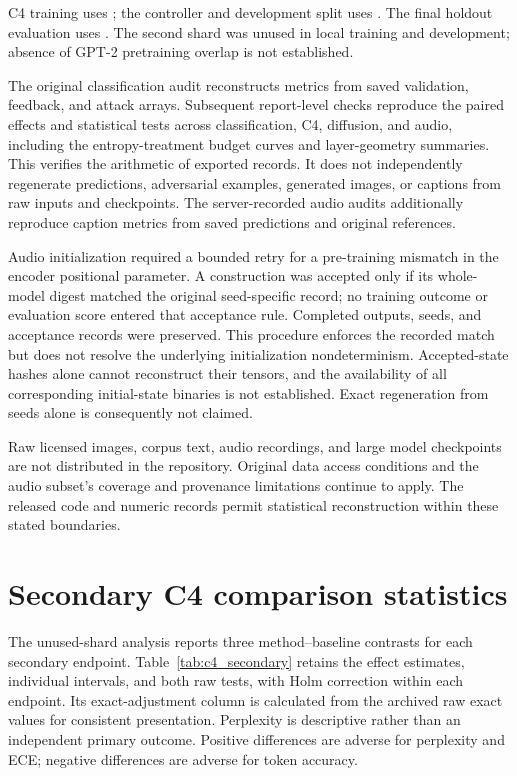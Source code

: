 \documentclass[a4paper,fleqn]{cas-dc}
\begin{document}
C4 training uses ; the controller
and development split uses .
The final holdout evaluation uses
.
The second shard was unused in local training and development; absence
of GPT-2 pretraining overlap is not established.

The original classification audit reconstructs metrics from saved
validation, feedback, and attack arrays. Subsequent report-level checks
reproduce the paired effects and statistical tests across classification,
C4, diffusion, and audio, including the entropy-treatment budget curves
and layer-geometry summaries. This verifies the arithmetic of exported
records. It does not independently regenerate predictions, adversarial
examples, generated images, or captions from raw inputs and checkpoints.
The server-recorded audio audits additionally reproduce caption metrics
from saved predictions and original references.

Audio initialization required a bounded retry for a pre-training
mismatch in the encoder positional parameter. A construction was accepted
only if its whole-model digest matched the original seed-specific record;
no training outcome or evaluation score entered that acceptance rule.
Completed outputs, seeds, and acceptance records were preserved. This
procedure enforces the recorded match but does not resolve the underlying
initialization nondeterminism. Accepted-state hashes alone cannot
reconstruct their tensors, and the availability of all corresponding
initial-state binaries is not established. Exact regeneration from seeds
alone is consequently not claimed.

Raw licensed images, corpus text, audio recordings, and large model
checkpoints are not distributed in the repository. Original data access
conditions and the audio subset's coverage and provenance limitations
continue to apply. The released code and numeric records permit statistical
reconstruction within these stated boundaries.

\section{Secondary C4 comparison statistics}\label{app:c4_secondary}
The unused-shard analysis reports three method--baseline
contrasts for each secondary endpoint. Table~\ref{tab:c4_secondary}
retains the effect estimates, individual intervals, and both raw tests,
with Holm correction within each endpoint. Its exact-adjustment column
is calculated from the archived raw exact values for consistent
presentation. Perplexity is descriptive rather than an independent
primary outcome. Positive differences are adverse for perplexity and ECE;
negative differences are adverse for token accuracy.
\end{document}
